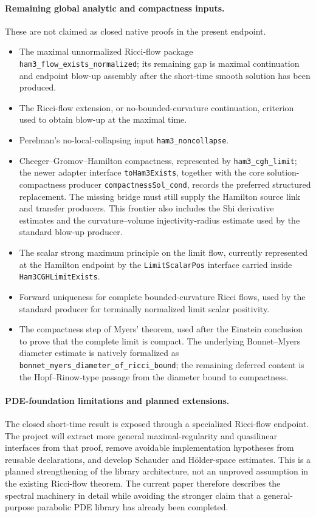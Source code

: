 \documentclass[11pt]{article}
\theoremstyle{plain}
\theoremstyle{definition}
\theoremstyle{remark}
\newcommand{\leanref}[1]{\nolinkurl{#1}}
\begin{document}
\paragraph{Remaining global analytic and compactness inputs.}
These are not claimed as closed native proofs in the present endpoint.
\begin{itemize}[leftmargin=2em]
  \item The maximal unnormalized Ricci-flow package
  \leanref{ham3_flow_exists_normalized}; its remaining gap is maximal
  continuation and endpoint blow-up assembly after the short-time smooth
  solution has been produced.
  \item The Ricci-flow extension, or no-bounded-curvature continuation,
  criterion used to obtain blow-up at the maximal time.
  \item Perelman's no-local-collapsing input \leanref{ham3_noncollapse}.
  \item Cheeger--Gromov--Hamilton compactness, represented by
  \leanref{ham3_cgh_limit}; the newer adapter interface
  \leanref{toHam3Exists}, together with the core solution-compactness producer
  \leanref{compactnessSol_cond}, records the preferred structured replacement.
  The missing bridge must still supply the Hamilton source link and transfer
  producers.  This frontier also includes the Shi derivative estimates and the
  curvature--volume injectivity-radius estimate used by the standard blow-up
  producer.
  \item The scalar strong maximum principle on the limit flow, currently
  represented at the Hamilton endpoint by the \leanref{LimitScalarPos}
  interface carried inside \leanref{Ham3CGHLimitExists}.
  \item Forward uniqueness for complete bounded-curvature Ricci flows, used
  by the standard producer for terminally normalized limit scalar positivity.
  \item The compactness step of Myers' theorem, used after the Einstein
  conclusion to prove that the complete limit is compact.  The underlying
  Bonnet--Myers diameter estimate is natively formalized as
  \leanref{bonnet_myers_diameter_of_ricci_bound}; the remaining deferred
  content is the Hopf--Rinow-type passage from the diameter bound to
  compactness.
\end{itemize}

\paragraph{PDE-foundation limitations and planned extensions.}
The closed short-time result is exposed through a specialized
Ricci-flow endpoint.  The project will extract more general maximal-regularity
and quasilinear interfaces from that proof, remove avoidable implementation
hypotheses from reusable declarations, and develop Schauder and H\"older-space
estimates.  This is a planned strengthening of the library architecture, not
an unproved assumption in the existing Ricci-flow theorem.  The current paper
therefore describes the spectral machinery in detail while avoiding the
stronger claim that a general-purpose parabolic PDE library has already been
completed.
\end{document}
